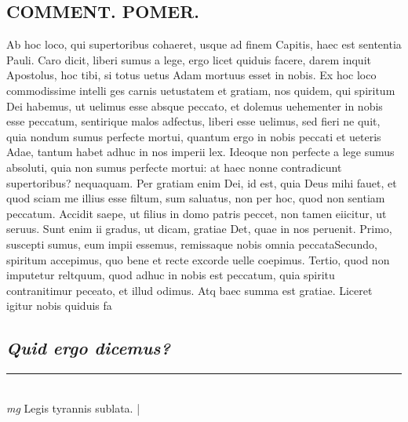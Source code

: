 \documentclass{article}
\begin{document}
\begin{pages}
\section*{COMMENT. POMER.  }\pstart Ab hoc loco, qui supertoribus cohaeret, usque ad finem Capitis, haec est sententia Pauli. Caro dicit, liberi sumus a lege, ergo licet quiduis facere, darem inquit Apostolus, hoc tibi, si totus uetus Adam mortuus esset in nobis. Ex hoc loco commodissime intelli ges carnis uetustatem et gratiam, nos quidem, qui spiritum Dei habemus, ut uelimus esse absque peccato, et dolemus uehementer in nobis esse peccatum, sentirique malos adfectus, liberi esse uelimus, sed fieri ne quit, quia nondum sumus perfecte mortui, quantum ergo in nobis peccati et ueteris Adae, tantum habet adhuc in nos imperii lex. Ideoque non perfecte a lege sumus absoluti, quia non sumus perfecte mortui: at haec nonne contradicunt supertoribus? nequaquam.  Per gratiam enim Dei, id est, quia Deus mihi fauet, et quod sciam me illius esse filtum, sum saluatus, non per hoc, quod non sentiam peccatum. Accidit saepe, ut filius in domo patris peccet, non tamen eiicitur, ut seruus. Sunt enim ii gradus, ut dicam, gratiae Det, quae in nos peruenit. Primo, suscepti sumus, eum impii essemus, remissaque nobis omnia peccataSecundo, spiritum accepimus, quo bene et recte excorde uelle coepimus. Tertio, quod non imputetur reltquum, quod adhuc in nobis est peccatum, quia spiritu contranitimur peceato, et illud odimus. Atq baec summa est gratiae. Liceret igitur nobis quiduis fa  \pend
{}
{}
\subsection*{\textit{Quid ergo dicemus? }}\pstart  \pend
\vspace{0.5cm}\noindent
\vspace{0.2cm}\rule{1cm}{0.2pt}\\ 
\hspace{0.2cm}\textit{mg}
\footnotesize Legis tyrannis sublata.  
\normalsize| 

\end{pages}
\end{document}
